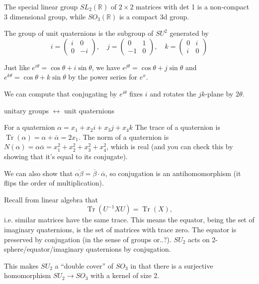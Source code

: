 \documentclass[10pt]{scrartcl}
\providecommand{\ol}{\overline}
\providecommand{\RR}{\mathbb R}
\providecommand{\opname}{\operatorname}
\providecommand{\inv}{^{-1}}
\begin{document}
\begin{example}
	The special linear group $SL_2(\RR)$ of $2\times 2$ matrices with det 1
	is a non-compact 3 dimensional group,
	while $SO_3(\RR)$ is a compact 3d group.
\end{example}

\begin{definition}[Quaternions]
	The group of unit quaternions is the subgroup of $SU^2$
	generated by
	\[i = \begin{pmatrix}
		i&0\\
		0&-i
	\end{pmatrix},\quad
	j = \begin{pmatrix}
		0&1\\
		-1&0
	\end{pmatrix},\quad
	k = \begin{pmatrix}
		0&i\\
		i&0
	\end{pmatrix}\]
\end{definition}

Just like $e^{i\theta} = \cos\theta + i\sin\theta$,
we have $e^{j\theta} = \cos\theta + j\sin\theta$
and $e^{k\theta} = \cos\theta + k\sin\theta$
by the power series for $e^x$.

We can compute that conjugating by $e^{i\theta}$ fixes $i$ and rotates
the $jk$-plane by $2\theta$.

unitary groups $\leftrightarrow$ unit quaternions

For a quaternion $\alpha = x_1 + x_2i + x_3j + x_4k$
The trace of a quaternion is $\opname{Tr}(\alpha) = \alpha + \ol\alpha = 2x_1$.
The norm of a quaternion is $N(\alpha) = \alpha\ol\alpha
= x_1^2 + x_2^2 + x_3^2 + x_4^2$, which is real
(and you can check this by showing that it's equal to its conjugate).

We can also show that $\ol{\alpha\beta} = \ol\beta\cdot\ol\alpha$,
so conjugation is an antihomomorphism (it flips the order of multiplication).

Recall from linear algebra that 
\[\opname{Tr}(U\inv X U) = \opname{Tr}(X),\]
i.e. similar matrices have the same trace.
This means the equator, being the set of imaginary quaternions,
is the set of matrices with trace zero.
The equator is preserved by conjugation (in the sense of groups or..?).
$SU_2$ acts on 2-sphere/equator/imaginary quaternions by conjugation.

This makes $SU_2$ a ``double cover'' of $SO_3$
in that there is a surjective homomorphism $SU_2\to SO_3$
with a kernel of size 2.
\end{document}
